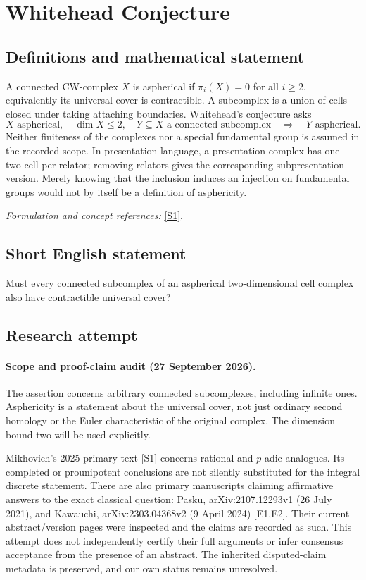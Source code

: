 \documentclass[11pt]{article}
\begin{document}
\section*{\texorpdfstring{Whitehead Conjecture}{Whitehead Conjecture}}\label{1486}
\subsection{Definitions and mathematical statement}
A connected CW-complex $X$ is aspherical if $\pi_i(X)=0$ for all $i\ge2$, equivalently its universal cover is contractible. A subcomplex is a union of cells closed under taking attaching boundaries. Whitehead's conjecture asks
\[
 X\text{ aspherical},\quad\dim X\le2,\quad
 Y\subseteq X\text{ a connected subcomplex}
 \quad\Longrightarrow\quad Y\text{ aspherical}.
\]
Neither finiteness of the complexes nor a special fundamental group is assumed in the recorded scope. In presentation language, a presentation complex has one two-cell per relator; removing relators gives the corresponding subpresentation version. Merely knowing that the inclusion induces an injection on fundamental groups would not by itself be a definition of asphericity.
\par\smallskip\textit{Formulation and concept references:} \href{https://www.mathnet.ru/php/archive.phtml?jrnid=im&option_lang=rus&paperid=9597&wshow=paper}{[S1]}.

\subsection{Short English statement}
Must every connected subcomplex of an aspherical two-dimensional cell complex also have contractible universal cover?
\subsection{Research attempt}
\paragraph{Scope and proof-claim audit (27 September 2026).}
The assertion concerns arbitrary connected subcomplexes, including
infinite ones. Asphericity is a statement about the universal cover,
not just ordinary second homology or the Euler characteristic of the
original complex. The dimension bound two will be used explicitly.

Mikhovich's 2025 primary text [S1] concerns rational and $p$-adic analogues.
Its completed or prounipotent conclusions are not silently substituted
for the integral discrete statement. There are also primary manuscripts
claiming affirmative answers to the exact classical question: Pasku,
arXiv:2107.12293v1 (26 July 2021), and Kawauchi,
arXiv:2303.04368v2 (9 April 2024) [E1,E2]. Their current abstract/version
pages were inspected and the claims are recorded as such. This attempt
does not independently certify their full arguments or infer consensus
acceptance from the presence of an abstract. The inherited disputed-claim
metadata is preserved, and our own status remains unresolved.
\end{document}
